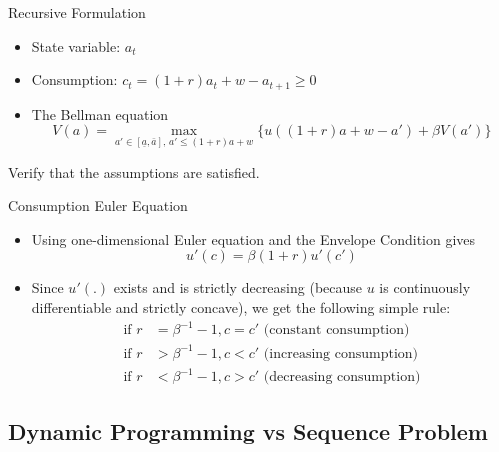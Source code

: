 \documentclass[9pt,aspectratio=169]{beamer}
\begin{document}
\begin{frame}{Recursive Formulation}
    \begin{itemize}
        \item State variable: $a_t$
        \item Consumption: $c_t = (1+r)a_t + w - a_{t+1} \geq 0$
        \item The Bellman equation
        \begin{equation*}
            V(a) = \max_{a' \in [\underline{a}, \bar{a}],\, a' \leq (1+r)a+w}
            \{u((1+r)a + w - a') + \beta V(a')\}
        \end{equation*}
    \end{itemize}
    Verify that the assumptions are satisfied.
\end{frame}

\begin{frame}{Consumption Euler Equation}
    \begin{itemize}
        \item Using one-dimensional Euler equation and the Envelope Condition gives
        \begin{equation*}
            u'(c) = \beta(1+r)u'(c')
        \end{equation*}
        \item Since $u'(.)$ exists and is strictly decreasing (because $u$ is
        continuously differentiable and strictly concave), we get the
        following simple rule:
        \begin{align*}
            \text{if } r &= \beta^{-1} - 1, c = c' \text{ (constant consumption)} \\
            \text{if } r &> \beta^{-1} - 1, c < c' \text{ (increasing consumption)} \\
            \text{if } r &< \beta^{-1} - 1, c > c' \text{ (decreasing consumption)}
        \end{align*}
    \end{itemize}
\end{frame}

\subsection{Dynamic Programming vs Sequence Problem}
\end{document}
